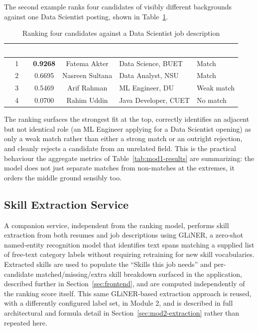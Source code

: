 \documentclass[11pt,a4paper]{article}
\newcommand{\hdrow}{\rowcolor{TPnavy}}
\newcommand{\hdtxt}[1]{\textcolor{white}{\bfseries #1}}
\begin{document}
The second example ranks four candidates of visibly different backgrounds against one Data Scientist posting, shown in Table~\ref{tab:mod1-demo-rank}.

\begin{table}[H]
\centering
\caption{Ranking four candidates against a Data Scientist job description}
\label{tab:mod1-demo-rank}
\small
\begin{tabular}{cccp{3.6cm}l}
\toprule
\hdrow \hdtxt{Rank} & \hdtxt{Score} & \hdtxt{Candidate} & \hdtxt{Background} & \hdtxt{Verdict} \\
\midrule
1 & \textbf{0.9268} & Fatema Akter & Data Science, BUET & Match \\
\rowcolor{TPlight}
2 & 0.6695 & Nasreen Sultana & Data Analyst, NSU & Match \\
3 & 0.5469 & Arif Rahman & ML Engineer, DU & Weak match \\
\rowcolor{TPlight}
4 & 0.0700 & Rahim Uddin & Java Developer, CUET & No match \\
\bottomrule
\end{tabular}
\end{table}

The ranking surfaces the strongest fit at the top, correctly identifies an adjacent but not identical role (an ML Engineer applying for a Data Scientist opening) as only a weak match rather than either a strong match or an outright rejection, and cleanly rejects a candidate from an unrelated field. This is the practical behaviour the aggregate metrics of Table~\ref{tab:mod1-results} are summarizing: the model does not just separate matches from non-matches at the extremes, it orders the middle ground sensibly too.

\subsection{Skill Extraction Service}
\label{sec:mod1-skillex}

A companion service, independent from the ranking model, performs skill extraction from both resumes and job descriptions using GLiNER, a zero-shot named-entity recognition model that identifies text spans matching a supplied list of free-text category labels without requiring retraining for new skill vocabularies. Extracted skills are used to populate the ``Skills this job needs'' and per-candidate matched/missing/extra skill breakdown surfaced in the application, described further in Section~\ref{sec:frontend}, and are computed independently of the ranking score itself. This same GLiNER-based extraction approach is reused, with a differently configured label set, in Module 2, and is described in full architectural and formula detail in Section~\ref{sec:mod2-extraction} rather than repeated here.
\end{document}
